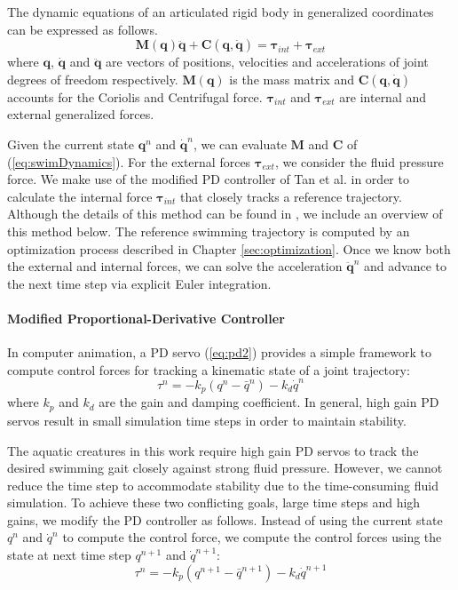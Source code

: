 The dynamic equations of an articulated rigid body in generalized coordinates can be expressed as follows.
\begin{equation}
\label{eq:swimDynamics}
\mathbf{M}(\mathbf{q})\mathbf{\ddot{q}}+\mathbf{C}(\mathbf{q},\mathbf{\dot{q}})=\mathbf{\tau}_{int}+\mathbf{\tau}_{ext}
\end{equation}
where $\mathbf{q}$, $\mathbf{\dot{q}}$ and $\mathbf{\ddot{q}}$ are vectors of positions, velocities and accelerations of joint degrees of freedom respectively. $\mathbf{M}(\mathbf{q})$ is the mass matrix and $\mathbf{C}(\mathbf{q},\mathbf{\dot{q}})$ accounts for the Coriolis and Centrifugal force. $\mathbf{\tau}_{int}$ and $\mathbf{\tau}_{ext}$ are internal and external generalized forces.

Given the current state $\mathbf{q}^n$ and $\mathbf{\dot{q}}^n$, we can
evaluate $\mathbf{M}$ and $\mathbf{C}$ of (\ref{eq:swimDynamics}). For the
external forces $\mathbf{\tau}_{ext}$, we consider the
fluid pressure force. We make use of the modified PD controller of Tan et al. \cite{Tan11SPD} in order to calculate the internal force $\mathbf{\tau}_{int}$ that closely tracks a reference trajectory. Although the details of this method can be found in \cite{Tan11SPD}, we include an overview of this method below. The reference swimming trajectory is computed by an optimization
process described in Chapter \ref{sec:optimization}. Once we know both the external and
internal forces, we can solve the acceleration $\mathbf{\ddot{q}}^n$ and
advance to the next time step via explicit Euler integration.

\paragraph {Modified Proportional-Derivative Controller} In computer
animation, a PD servo (\ref{eq:pd2}) provides a simple framework to
compute control forces for tracking a kinematic state of a joint
trajectory:
\begin{equation}
\label{eq:pd2}
\tau^n=-k_p(q^n-\bar{q}^n)-k_d\dot{q}^n
\end{equation}
where $k_p$ and $k_d$ are the gain and damping coefficient. In general,
high gain PD servos result in small simulation time steps in order to
maintain stability.

The aquatic creatures in this work require high gain PD servos to track the desired swimming gait closely against strong fluid pressure. However, we cannot reduce the time step to accommodate stability due to the time-consuming fluid simulation. To achieve these two conflicting goals, large time steps and high gains, we modify the PD controller as follows. Instead of using the current state $q^n$ and $\dot{q}^n$ to compute the control force, we compute the control forces using the state at next time step $q^{n+1}$ and $\dot{q}^{n+1}$:
\begin{equation} \label{eq:pd3}
\tau^n=-k_p(q^{n+1}-\bar{q}^{n+1})-k_d\dot{q}^{n+1}
\end{equation}

